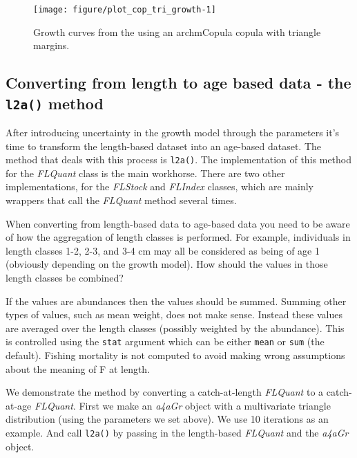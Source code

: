 \documentclass[a4paper,english,10pt]{article}\usepackage[]{graphicx}\usepackage[]{color}
\makeatletter
\def\maxwidth{ %
  \ifdim\Gin@nat@width>\linewidth
    \linewidth
  \else
    \Gin@nat@width
  \fi
}
\newenvironment{knitrout}{}{} %
\newcommand{\code}[1]{{\texttt{#1}}}
\newcommand{\class}[1]{{\textit{#1}}}
\makeatother
\begin{document}
\begin{knitrout}
\color{fgcolor}\begin{figure}[H]

{\centering \texttt{[image: figure/plot\_cop\_tri\_growth-1]} 

}

\caption[Growth curves from the using an archmCopula copula with triangle margins]{Growth curves from the using an archmCopula copula with triangle margins.\label{fig:plot_cop_tri_growth}}
\end{figure}


\end{knitrout}

\subsection{Converting from length to age based data - the \code{l2a()} method}

After introducing uncertainty in the growth model through the parameters it's time to transform the length-based dataset into an age-based dataset. The method that deals with this process is \code{l2a()}. The implementation of this method for the \class{FLQuant} class is the main workhorse. There are two other implementations, for the \class{FLStock} and \class{FLIndex} classes, which are mainly wrappers that call the \class{FLQuant} method several times.

When converting from length-based data to age-based data you need to be aware of how the aggregation of length classes is performed. For example, individuals in length classes 1-2, 2-3, and 3-4 cm may all be considered as being of age 1 (obviously depending on the growth model). How should the values in those length classes be combined?

If the values are abundances then the values should be summed. Summing other types of values, such as mean weight, does not make sense. Instead these values are averaged over the length classes (possibly weighted by the abundance). This is controlled using the \code{stat} argument which can be either \code{mean} or \code{sum} (the default). Fishing mortality is not computed to avoid making wrong assumptions about the meaning of F at length.

We demonstrate the method by converting a catch-at-length \class{FLQuant} to a catch-at-age \class{FLQuant}. First we make an \class{a4aGr} object with a multivariate triangle distribution (using the parameters we set above). We use 10 iterations as an example. And call \code{l2a()} by passing in the length-based \class{FLQuant} and the \class{a4aGr} object.
\end{document}
